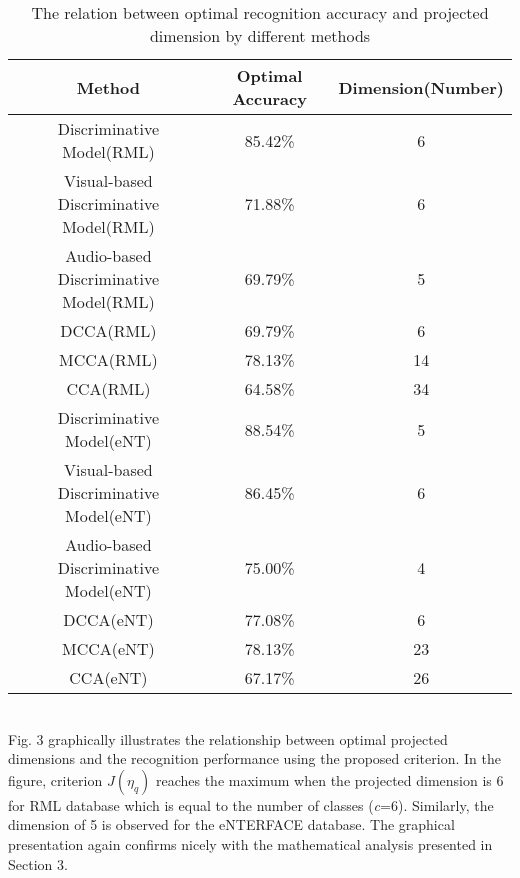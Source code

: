 \documentclass[10pt,journal,compsoc]{IEEEtran}
\begin{document}
\begin{table}[h]
\scriptsize
\renewcommand{\arraystretch}{1.5}
\caption{\normalsize{The relation between optimal recognition accuracy and projected dimension by different methods}}
\setlength{\abovecaptionskip}{0pt}
\setlength{\belowcaptionskip}{10pt}
\centering
\tabcolsep 0.01in
\begin{tabular}{ccc}
\hline
Method & Optimal Accuracy & Dimension(Number)\\
\hline
Discriminative Model(RML) &85.42\% & 6\\
Visual-based Discriminative Model(RML) &71.88\% & 6\\
Audio-based Discriminative Model(RML) &69.79\% & 5\\
DCCA(RML) &69.79\% & 6\\
MCCA(RML) &78.13\% & 14\\
CCA(RML) &64.58\% & 34\\
Discriminative Model(eNT) &88.54\% & 5\\
Visual-based Discriminative Model(eNT) &86.45\% & 6\\
Audio-based Discriminative Model(eNT) &75.00\% & 4\\
DCCA(eNT) &77.08\% & 6\\
MCCA(eNT) &78.13\% & 23\\
CCA(eNT) &67.17\% & 26\\
\hline
\end{tabular}
\end{table}\\
 Fig. 3 graphically illustrates the relationship between optimal projected dimensions and the recognition performance using the proposed criterion. In the figure, criterion $J(\eta_q)$ reaches the maximum when the projected dimension is 6 for RML database which is equal to the number of classes (\textit{c}=6). Similarly, the dimension of 5 is observed for the eNTERFACE database. The graphical presentation again confirms nicely with the mathematical analysis presented in Section 3.


%
%
\end{document}
